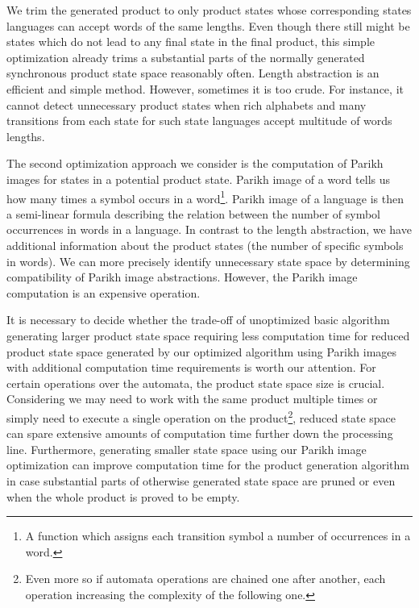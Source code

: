 We trim the generated product to only product states whose corresponding states languages can accept words of the same lengths. Even though there still might be states which do not lead to any final state in the final product, this simple optimization already trims a substantial parts of the normally generated synchronous product state space reasonably often. Length abstraction is an efficient and simple method. However, sometimes it is too crude. For instance, it cannot detect unnecessary product states when rich alphabets and many transitions from each state for such state languages accept multitude of words lengths.



The second optimization approach we consider is the computation of Parikh images for states in a potential product state. Parikh image of a word tells us how many times a symbol occurs in a word\footnote{A function which assigns each transition symbol a number of occurrences in a word.}. Parikh image of a language is then a semi-linear formula describing the relation between the number of symbol occurrences in words in a language. In contrast to the length abstraction, we have additional information about the product states (the number of specific symbols in words). We can more precisely identify unnecessary state space by determining compatibility of Parikh image abstractions. However, the Parikh image computation is an expensive operation.

It is necessary to decide whether the trade-off of unoptimized basic algorithm generating larger product state space requiring less computation time for reduced product state space generated by our optimized algorithm using Parikh images with additional computation time requirements is worth our attention. For certain operations over the automata, the product state space size is crucial. Considering we may need to work with the same product multiple times or simply need to execute a single operation on the product\footnote{Even more so if automata operations are chained one after another, each operation increasing the complexity of the following one.}, reduced state space can spare extensive amounts of computation time further down the processing line. Furthermore, generating smaller state space using our Parikh image optimization can improve computation time for the product generation algorithm in case substantial parts of otherwise generated state space are pruned or even when the whole product is proved to be empty.


